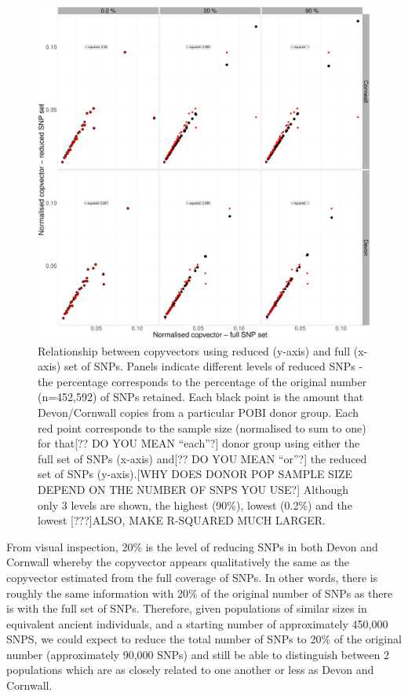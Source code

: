 \begin{figure}[htp]
    \centering
    \includegraphics[width=1.0\textwidth]{../images/chapter1/Devon_Cornwall_copyvectors_sample_size_reduced.pdf}
    \caption{Relationship between copyvectors using reduced (y-axis) and full (x-axis) set of SNPs. Panels indicate different levels of reduced SNPs - the percentage corresponds to the percentage of the original number (n=452,592) of SNPs retained. Each black point is the amount that Devon/Cornwall copies from a particular POBI donor group. Each red point corresponds to the sample size (normalised to sum to one) for that{\color{red}[?? DO YOU MEAN ``each''?]} donor group using either the full set of SNPs (x-axis) and{\color{red}[?? DO YOU MEAN ``or''?]} the reduced set of SNPs (y-axis).{\color{red}[WHY DOES DONOR POP SAMPLE SIZE DEPEND ON THE NUMBER OF SNPS YOU USE?]} Although only 3 levels are shown, the highest (90\%), lowest (0.2\%) and the lowest {\color{red}[???]ALSO, MAKE R-SQUARED MUCH LARGER.}}
    \label{fig:Devon_Cornwall_copyvectors_sample_size_reduced}
\end{figure}

From visual inspection, 20\% is the level of reducing SNPs in both Devon and Cornwall whereby the copyvector appears qualitatively the same as the copyvector estimated from the full coverage of SNPs. In other words, there is roughly the same information with 20\% of the original number of SNPs as there is with the full set of SNPs. Therefore, given populations of similar sizes in equivalent ancient individuals, and a starting number of approximately 450,000 SNPS, we could expect to reduce the total number of SNPs to 20\% of the original number (approximately 90,000 SNPs) and still be able to distinguish between 2 populations which are as closely related to one another or less as Devon and Cornwall. 

